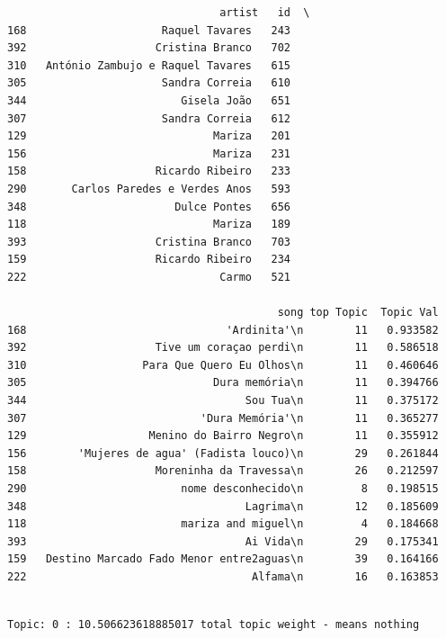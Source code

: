 \documentclass[11pt]{article}
\begin{document}
    
    \begin{verbatim}
                                 artist   id  \
168                     Raquel Tavares   243   
392                    Cristina Branco   702   
310   António Zambujo e Raquel Tavares   615   
305                     Sandra Correia   610   
344                        Gisela João   651   
307                     Sandra Correia   612   
129                             Mariza   201   
156                             Mariza   231   
158                    Ricardo Ribeiro   233   
290       Carlos Paredes e Verdes Anos   593   
348                       Dulce Pontes   656   
118                             Mariza   189   
393                    Cristina Branco   703   
159                    Ricardo Ribeiro   234   
222                              Carmo   521   

                                          song top Topic  Topic Val  
168                               'Ardinita'\n        11   0.933582  
392                    Tive um coraçao perdi\n        11   0.586518  
310                  Para Que Quero Eu Olhos\n        11   0.460646  
305                             Dura memória\n        11   0.394766  
344                                  Sou Tua\n        11   0.375172  
307                           'Dura Memória'\n        11   0.365277  
129                   Menino do Bairro Negro\n        11   0.355912  
156        'Mujeres de agua' (Fadista louco)\n        29   0.261844  
158                    Moreninha da Travessa\n        26   0.212597  
290                        nome desconhecido\n         8   0.198515  
348                                  Lagrima\n        12   0.185609  
118                        mariza and miguel\n         4   0.184668  
393                                  Ai Vida\n        29   0.175341  
159   Destino Marcado Fado Menor entre2aguas\n        39   0.164166  
222                                   Alfama\n        16   0.163853  
    \end{verbatim}

    
    \begin{Verbatim}[commandchars=\\\{\}]

Topic: 0 : 10.506623618885017 total topic weight - means nothing

    \end{Verbatim}
\end{document}
